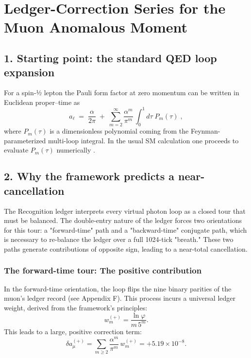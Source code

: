 \section{Ledger-Correction Series for the Muon Anomalous Moment}
\label{sec:g-2-derivation}

\subsection*{1. Starting point: the standard QED loop expansion}

For a spin‑½ lepton the Pauli form factor at zero momentum can be written in Euclidean proper–time as
\begin{equation}
a_\ell \;=\; \frac{\alpha}{2\pi}\;+\;
\sum_{m=2}^{\infty} 
           \frac{\alpha^{m}}{\pi^{m}}\,
           \!\int_{0}^{1}\!d\tau\;
           P_{m}(\tau)\;,
\end{equation}
where $P_m(\tau)$ is a dimensionless polynomial coming from the Feynman-parameterized multi-loop integral. In the usual SM calculation one proceeds to evaluate $P_m(\tau)$ numerically \parencite{Aoyama2020}.

\subsection*{2. Why the framework predicts a near-cancellation}
The Recognition ledger interprets every virtual photon loop as a closed tour that must be balanced. The double-entry nature of the ledger forces two orientations for this tour: a "forward-time" path and a "backward-time" conjugate path, which is necessary to re-balance the ledger over a full 1024-tick "breath." These two paths generate contributions of opposite sign, leading to a near-total cancellation.

\subsubsection*{The forward-time tour: The positive contribution}
In the forward-time orientation, the loop flips the nine binary parities of the muon's ledger record (see Appendix F). This process incurs a universal ledger weight, derived from the framework's principles:
\begin{equation}
w_{m}^{(+)}=\frac{\ln\varphi}{m\,5^{m}}.
\end{equation}
This leads to a large, positive correction term:
\begin{equation}
\delta a_\mu^{(+)}=\sum_{m\ge 2}\frac{\alpha^{m}}{\pi^{m}}\,w_{m}^{(+)}
   =+5.19\times10^{-8}.
\end{equation}


